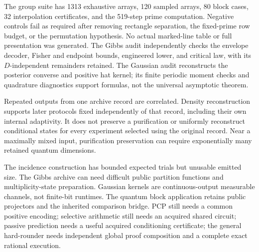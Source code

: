 \documentclass[11pt]{article}
\theoremstyle{definition}
\begin{document}
The group suite has 1313 exhaustive arrays, 120 sampled arrays,
80 block cases, 32 interpolation certificates, and the 519-step
prime computation. Negative controls fail as required after
removing rectangle separation, the fixed-prime row budget, or the
permutation hypothesis. No actual marked-line table or full
presentation was generated. The Gibbs audit independently checks
the envelope decoder, Fisher and endpoint bounds, engineered lower,
and critical law, with its $D$-independent remainders retained.
The Gaussian audit reconstructs the posterior converse and positive
hat kernel; its finite periodic moment checks and quadrature
diagnostics support formulas, not the universal asymptotic theorem.

Repeated outputs from one archive record are correlated.
Density reconstruction supports later protocols fixed independently
of that record, including their own internal adaptivity.
It does not preserve a purification or uniformly reconstruct
conditional states for every experiment selected using the original
record. Near a maximally mixed input, purification preservation can
require exponentially many retained quantum dimensions.

The incidence construction has bounded expected trials but unusable
emitted size. The Gibbs archive can need difficult public partition
functions and multiplicity-state preparation. Gaussian kernels
are continuous-output measurable channels, not finite-bit runtimes.
The quantum block application retains public projectors and the
inherited comparison bridge. PCP still needs a common positive
encoding; selective arithmetic still needs an acquired shared
circuit; passive prediction needs a useful acquired conditioning
certificate; the general hard-rounder needs independent global
proof composition and a complete exact rational execution.
\end{document}
